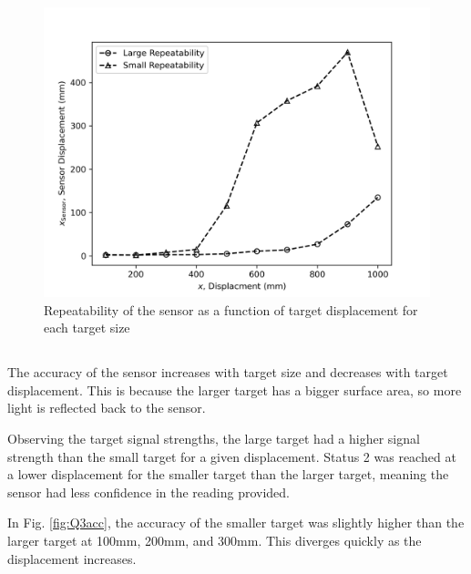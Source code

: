 \begin{figure}[h]
    \centering
    \includegraphics[width=0.6\linewidth]{matplotlib/Q3rep.png}
    \caption{Repeatability of the sensor as a function of target displacement for each target size}
    \label{fig:Q3rep}
\end{figure}

\FloatBarrier
\subsection{}

The accuracy of the sensor increases with target size and decreases with target displacement. This is because the larger target has a 
bigger surface area, so more light is reflected back to the sensor. 

Observing the target signal strengths, the large target had a higher signal strength than the small target for a given displacement. Status 2 was reached
at a lower displacement for the smaller target than the larger target, meaning the sensor had less confidence in the reading provided.

In Fig. \ref{fig:Q3acc}, the accuracy of the smaller target was slightly higher than the larger target at 100mm, 200mm, and 300mm. This diverges
quickly as the displacement increases.  